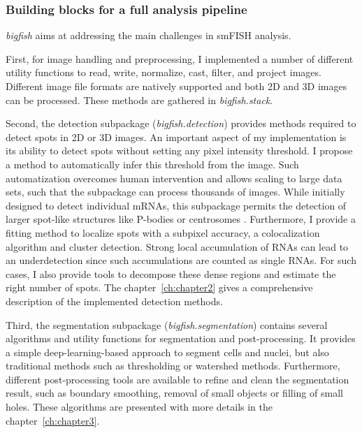 \subsubsection{Building blocks for a full analysis pipeline}

\emph{bigfish} aims at addressing the main challenges in \ac{smFISH} analysis.

First, for image handling and preprocessing, I implemented a number of different utility functions to read, write, normalize, cast, filter, and project images.
Different image file formats are natively supported and both 2D and 3D images can be processed.
These methods are gathered in \emph{bigfish.stack}.

Second, the detection subpackage (\emph{bigfish.detection}) provides methods required to detect spots in 2D or 3D images.
An important aspect of my implementation is its ability to detect spots without setting any pixel intensity threshold.
I propose a method to automatically infer this threshold from the image.
Such automatization overcomes human intervention and allows scaling to large data sets, such that the subpackage can process thousands of images.
While initially designed to detect individual \ac{mRNA}s, this subpackage permits the detection of larger spot-like structures like P-bodies or centrosomes .
Furthermore, I provide a fitting method to localize spots with a subpixel accuracy, a colocalization algorithm and cluster detection.
Strong local accumulation of \ac{RNA}s can lead to an underdetection since such accumulations are counted as single \ac{RNA}s.
For such cases, I also provide tools to decompose these dense regions and estimate the right number of spots.
The chapter~\ref{ch:chapter2} gives a comprehensive description of the implemented detection methods.

Third, the segmentation subpackage (\emph{bigfish.segmentation}) contains several algorithms and utility functions for segmentation and post-processing.
It provides a simple deep-learning-based approach to segment cells and nuclei, but also traditional methods such as thresholding or watershed methods.
Furthermore, different post-processing tools are available to refine and clean the segmentation result, such as boundary smoothing, removal of small objects or filling of small holes.
These algorithms are presented with more details in the chapter~\ref{ch:chapter3}.

